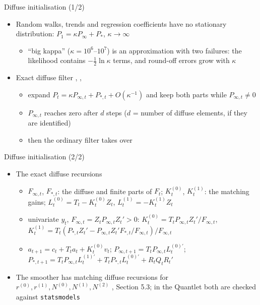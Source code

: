 \begin{frame}{Diffuse initialisation (1/2)}
\itemsize{\small}
\begin{itemize}
    \item Random walks, trends and regression coefficients have no stationary distribution: $P_1 = \kappa P_\infty + P_*$, $\kappa \to \infty$
    \begin{itemize}
        \item ``big kappa'' ($\kappa = 10^6$--$10^7$) is an approximation with two failures: the likelihood contains $-\frac12\ln\kappa$ terms, and round-off errors grow with $\kappa$
    \end{itemize}
    \item Exact diffuse filter , , 
    \begin{itemize}
        \item expand $P_t = \kappa P_{\infty,t} + P_{*,t} + O(\kappa^{-1})$ and keep both parts while $P_{\infty,t} \ne 0$
        \item $P_{\infty,t}$ reaches zero after $d$ steps ($d$ = number of diffuse elements, if they are identified)
        \item then the ordinary filter takes over
    \end{itemize}
\end{itemize}
\end{frame}

\begin{frame}{Diffuse initialisation (2/2)}
\itemsize{\footnotesize}
\begin{itemize}
    \item The exact diffuse recursions
    \begin{itemize}
        \item $F_{\infty,t}$, $F_{*,t}$: the diffuse and finite parts of $F_t$; $K^{(0)}_t$, $K^{(1)}_t$: the matching gains; $L^{(0)}_t = T_t - K^{(0)}_tZ_t$, $L^{(1)}_t = -K^{(1)}_tZ_t$
        \item univariate $y_t$, $F_{\infty,t} = Z_tP_{\infty,t}Z_t' > 0$: $K^{(0)}_t = T_tP_{\infty,t}Z_t'/F_{\infty,t}$, $K^{(1)}_t = T_t(P_{*,t}Z_t' - P_{\infty,t}Z_t'F_{*,t}/F_{\infty,t})/F_{\infty,t}$
        \item $a_{t+1} = c_t + T_ta_t + K^{(0)}_tv_t$; $P_{\infty,t+1} = T_tP_{\infty,t}L^{(0)\prime}_t$; $P_{*,t+1} = T_tP_{\infty,t}L^{(1)\prime}_t + T_tP_{*,t}L^{(0)\prime}_t + R_tQ_tR_t'$
    \end{itemize}
    \item The smoother has matching diffuse recursions for $r^{(0)}, r^{(1)}, N^{(0)}, N^{(1)}, N^{(2)}$ , Section 5.3; in the Quantlet both are checked against \texttt{statsmodels}
\end{itemize}
\end{frame}

